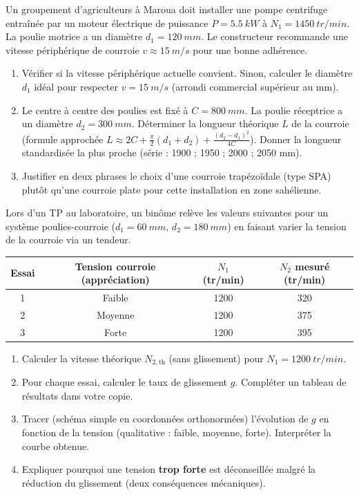 \documentclass[11pt]{article}
\begin{document}
\begin{exercice}
Un groupement d'agriculteurs à Maroua doit installer une pompe centrifuge entraînée par un moteur électrique de puissance $P = \SI{5,5}{kW}$ à $N_1 = \SI{1450}{tr/min}$. La poulie motrice a un diamètre $d_1 = \SI{120}{mm}$. Le constructeur recommande une vitesse périphérique de courroie $v \approx \SI{15}{m/s}$ pour une bonne adhérence.
\begin{enumerate}
    \item Vérifier si la vitesse périphérique actuelle convient. Sinon, calculer le diamètre $d_1$ idéal pour respecter $v = \SI{15}{m/s}$ (arrondi commercial supérieur au mm).
    \item Le centre à centre des poulies est fixé à $C = \SI{800}{mm}$. La poulie réceptrice a un diamètre $d_2 = \SI{300}{mm}$. Déterminer la longueur théorique $L$ de la courroie (formule approchée $L \approx 2C + \frac{\pi}{2}(d_1+d_2) + \frac{(d_2-d_1)^2}{4C}$). Donner la longueur standardisée la plus proche (série : 1900 ; 1950 ; 2000 ; 2050 mm).
    \item Justifier en deux phrases le choix d'une courroie trapézoïdale (type SPA) plutôt qu'une courroie plate pour cette installation en zone sahélienne.
\end{enumerate}
\end{exercice}

\begin{exercice}
Lors d'un TP au laboratoire, un binôme relève les valeurs suivantes pour un système poulies-courroie ($d_1 = \SI{60}{mm}$, $d_2 = \SI{180}{mm}$) en faisant varier la tension de la courroie via un tendeur.

\begin{tabular}{|c|c|c|c|}
\hline
Essai & Tension courroie (appréciation) & $N_1$ (tr/min) & $N_2$ mesuré (tr/min) \\
\hline
1 & Faible & 1200 & 320 \\
2 & Moyenne & 1200 & 375 \\
3 & Forte & 1200 & 395 \\
\hline
\end{tabular}

\begin{enumerate}
    \item Calculer la vitesse théorique $N_{2,\text{th}}$ (sans glissement) pour $N_1 = \SI{1200}{tr/min}$.
    \item Pour chaque essai, calculer le taux de glissement $g$. Compléter un tableau de résultats dans votre copie.
    \item Tracer (schéma simple en coordonnées orthonormées) l'évolution de $g$ en fonction de la tension (qualitative : faible, moyenne, forte). Interpréter la courbe obtenue.
    \item Expliquer pourquoi une tension \textbf{trop forte} est déconseillée malgré la réduction du glissement (deux conséquences mécaniques).
\end{enumerate}
\end{exercice}
\end{document}
